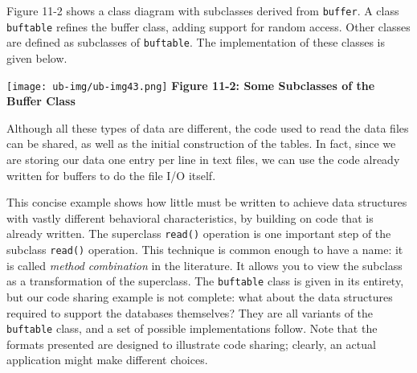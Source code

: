 Figure 11-2 shows a class diagram with subclasses derived from
\texttt{buffer}. A class \texttt{buftable} refines the
buffer class, adding support for random access. Other classes are
defined as subclasses of \texttt{buftable}. The implementation of these
classes is given below.


\begin{center}
\texttt{[image: ub-img/ub-img43.png]}
\linebreak
{\sffamily\bfseries Figure 11-2: Some Subclasses of the Buffer Class}
\end{center}

\bigskip

Although all these types of data are different, the code used to read
the data files can be shared, as well as the initial construction of
the tables. In fact, since we are storing our data one entry per line
in text files, we can use the code already written for buffers to do
the file I/O itself.


This concise example shows how little must be written to achieve data
structures with vastly different behavioral characteristics, by
building on code that is already written. The superclass
\texttt{read()} operation is one important step of the subclass
\texttt{read()} operation. This technique is common enough to have a
name: it is called \textit{method
}\textit{combination} in the literature. It
allows you to view the subclass as a transformation of the superclass.
The \texttt{buftable} class is given in its entirety, but our code
sharing example is not complete: what about the data structures
required to support the databases themselves? They are all variants of
the \texttt{buftable} class, and a set of possible implementations
follow. Note that the formats presented are designed to illustrate code
sharing; clearly, an actual application might make different choices.

